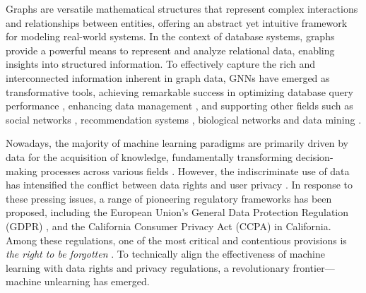 Graphs are versatile mathematical structures that represent complex interactions and relationships between entities, offering an abstract yet intuitive framework for modeling real-world systems. In the context of database systems, graphs provide a powerful means to represent and analyze relational data, enabling insights into structured information. To effectively capture the rich and interconnected information inherent in graph data, GNNs \cite{2016Convolutional_ChebNet,sun2023adpa,luo2024classic} have emerged as transformative tools, achieving remarkable success in optimizing database query performance \cite{qgdatabase,robinson2015graph,ngdatabase,cvitkovic2020supervised}, enhancing data management \cite{angles2018introduction,aggarwal2010graph}, and supporting other fields such as social networks \cite{app10041327,ijcai2018p142}, recommendation systems \cite{su2024dcl, LightGCN, cai2023app_gnn_rec3}, biological networks \cite{NIPS2017_f5077839,10.1093/bioinformatics/bty294,qu2023app_gnn_bio2} and data mining \cite{ieeedataming2012,wsdmdataming2021}.



Nowadays, the majority of machine learning paradigms are primarily driven by data for the acquisition of knowledge, fundamentally transforming decision-making processes across various fields \cite{wu2020gnn_survey1,zhou2022gnn_survey2,bessadok2022gnn_survey3}. However, the indiscriminate use of data has intensified the conflict between data rights and user privacy \cite{liu2020privacy,tanuwidjaja2020privacy,wu2022survey}. In response to these pressing issues, a range of pioneering regulatory frameworks has been proposed, including the European Union’s General Data Protection Regulation (GDPR) \cite{GDPR}, and the California Consumer Privacy Act (CCPA) \cite{CCPA1} in California.
Among these regulations, one of the most critical and contentious provisions is \emph{the right to be forgotten} \cite{kwak2017let}. To technically align the effectiveness of machine learning with data rights and privacy regulations, a revolutionary frontier—machine unlearning \cite{Cao2015Towards, Xu2023ACMMU} has emerged.

